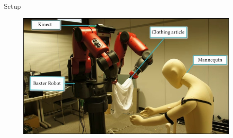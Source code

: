 \documentclass[aspectratio=43,11pt,xcolor={dvipsnames}]{beamer}
\begin{document}
\begin{frame}{Setup}
	\begin{figure}
		\includegraphics[width=\textwidth]{setup}
	\end{figure}
\end{frame}
\end{document}

